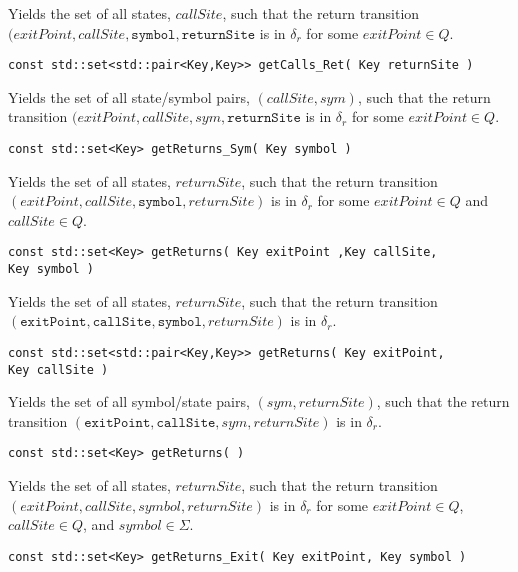 \begin{description}
    Yields the set of all states, $callSite$, such that the return transition
    $(exitPoint,callSite,\texttt{symbol},\texttt{returnSite}$ is in
    $\delta_r$ for some $exitPoint \in Q$.

  \item\texttt{const std::set<std::pair<Key,Key>> getCalls\_Ret( Key returnSite )} \nopagebreak

    Yields the set of all state/symbol pairs, $(callSite,sym)$, such that the
    return transition $(exitPoint,callSite,sym,\texttt{returnSite}$ is in
    $\delta_r$ for some $exitPoint \in Q$.

  \item\texttt{const std::set<Key> getReturns\_Sym( Key symbol )} \nopagebreak

    Yields the set of all states, $returnSite$, such that the return
    transition $(exitPoint,callSite,\texttt{symbol},returnSite)$ is in
    $\delta_r$ for some $exitPoint \in Q$ and $callSite \in Q$.

  \item\texttt{const std::set<Key> getReturns( Key exitPoint ,Key callSite,\\ \hspace*{3.25cm} Key symbol )} \nopagebreak

    Yields the set of all states, $returnSite$, such that the return
    transition
    $(\texttt{exitPoint},\texttt{callSite},\texttt{symbol},returnSite)$ is in
    $\delta_r$.

  \item\texttt{const std::set<std::pair<Key,Key>> getReturns( Key exitPoint,\\ \hspace*{3.25cm} Key callSite )} \nopagebreak

    Yields the set of all symbol/state pairs, $(sym,returnSite)$, such that
    the return transition
    $(\texttt{exitPoint},\texttt{callSite},sym,returnSite)$ is in $\delta_r$.

  \item\texttt{const std::set<Key> getReturns( )} \nopagebreak

    Yields the set of all states, $returnSite$, such that the return
    transition $(exitPoint,callSite,symbol,returnSite)$ is in $\delta_r$ for
    some $exitPoint \in Q$, $callSite \in Q$, and $symbol \in \Sigma$.

  \item\texttt{const std::set<Key> getReturns\_Exit( Key exitPoint, Key symbol )} \nopagebreak


\end{description}
